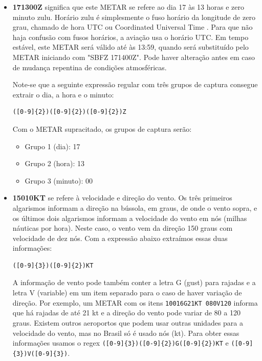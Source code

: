 \begin{itemize}
\item \textbf{171300Z} significa que este METAR se refere ao dia 17 às 13 horas e zero 
minuto zulu. Horário zulu é simplesmente o fuso horário da longitude de zero grau, 
chamado de hora UTC ou Coordinated Universal Time \cite{UTC}. Para que não haja 
confusão com fusos horários, a aviação usa o horário UTC. Em tempo
estável, este 
METAR será válido até às 13:59, quando será substituído pelo METAR iniciando com 
"SBFZ 171400Z". Pode haver alteração antes em caso de mudança repentina de condições 
atmosféricas.

Note-se que a seguinte expressão regular com três grupos de captura consegue extrair 
o dia, a hora e o minuto:

\begin{verbatim}
([0-9]{2})([0-9]{2})([0-9]{2})Z
\end{verbatim}

Com o METAR supracitado, os grupos de captura serão:

\begin{itemize}
\item Grupo 1 (dia): 17
\item Grupo 2 (hora): 13
\item Grupo 3 (minuto): 00
\end{itemize}

\item \textbf{15010KT} se refere à velocidade e direção do vento. Os três primeiros 
algarismos informam a direção na bússola, em graus, de onde o vento sopra, e os 
últimos dois algarismos informam a velocidade do vento em nós (milhas náuticas por hora). 
Neste caso, o vento vem da direção 150 graus com velocidade de dez nós. Com a 
expressão abaixo extraímos essas duas informações:

\begin{verbatim}
([0-9]{3})([0-9]{2})KT
\end{verbatim}

A informação de vento pode também conter a letra G (gust) para rajadas e a letra 
V (variable) em um item separado para o caso de haver variação de direção. Por 
exemplo, um METAR com os itens \texttt{10016G21KT 080V120} informa que há rajadas 
de até 21 kt e a direção do vento pode variar de 80 a 120 graus. Existem outros 
aeroportos que podem usar outras unidades para a velocidade do vento, mas no 
Brasil só é usado nós (kt). Para obter essas informações usamos o regex 
\verb|([0-9]{3})([0-9]{2})G([0-9]{2})KT| e \verb|([0-9]{3})V([0-9]{3})|.


\end{itemize}
